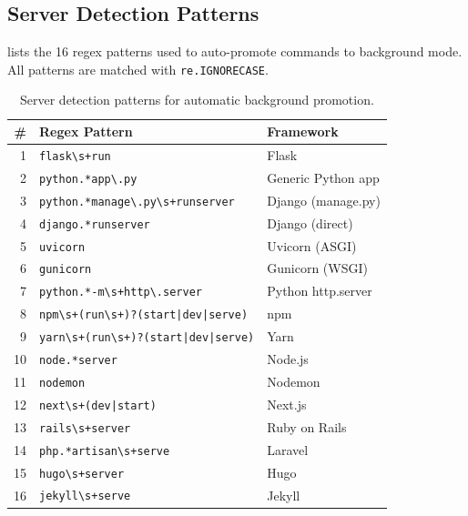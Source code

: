 \subsection{Server Detection Patterns}
\label{app:server_patterns}

 lists the 16 regex patterns used to auto-promote commands to background mode. All patterns are matched with \texttt{re.IGNORECASE}.

\begin{table}[h]
\centering
\caption{Server detection patterns for automatic background promotion.}
\label{tab:server_patterns}
\scriptsize
\begin{tabular}{@{}rp{5.5cm}l@{}}
\toprule
\textbf{\#} & \textbf{Regex Pattern} & \textbf{Framework} \\
\midrule
1 & \texttt{flask\textbackslash s+run} & Flask \\
2 & \texttt{python.*app\textbackslash .py} & Generic Python app \\
3 & \texttt{python.*manage\textbackslash .py\textbackslash s+runserver} & Django (manage.py) \\
4 & \texttt{django.*runserver} & Django (direct) \\
5 & \texttt{uvicorn} & Uvicorn (ASGI) \\
6 & \texttt{gunicorn} & Gunicorn (WSGI) \\
7 & \texttt{python.*-m\textbackslash s+http\textbackslash .server} & Python http.server \\
8 & \texttt{npm\textbackslash s+(run\textbackslash s+)?(start|dev|serve)} & npm \\
9 & \texttt{yarn\textbackslash s+(run\textbackslash s+)?(start|dev|serve)} & Yarn \\
10 & \texttt{node.*server} & Node.js \\
11 & \texttt{nodemon} & Nodemon \\
12 & \texttt{next\textbackslash s+(dev|start)} & Next.js \\
13 & \texttt{rails\textbackslash s+server} & Ruby on Rails \\
14 & \texttt{php.*artisan\textbackslash s+serve} & Laravel \\
15 & \texttt{hugo\textbackslash s+server} & Hugo \\
16 & \texttt{jekyll\textbackslash s+serve} & Jekyll \\
\bottomrule
\end{tabular}
\end{table}

